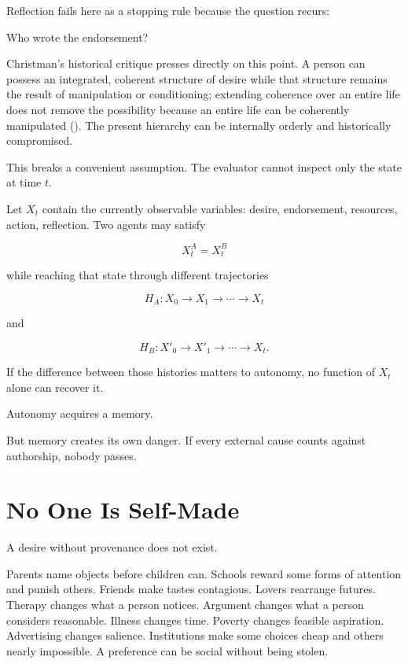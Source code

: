 \documentclass[
  10.5pt,
  letterpaper,
]{article}
\begin{document}
Reflection fails here as a stopping rule because the question recurs:

Who wrote the endorsement?

Christman's historical critique presses directly on this point. A person
can possess an integrated, coherent structure of desire while that
structure remains the result of manipulation or conditioning; extending
coherence over an entire life does not remove the possibility because an
entire life can be coherently manipulated
(). The present
hierarchy can be internally orderly and historically compromised.

This breaks a convenient assumption. The evaluator cannot inspect only
the state at time \(t\).

Let \(X_t\) contain the currently observable variables: desire,
endorsement, resources, action, reflection. Two agents may satisfy

\[
X_t^A = X_t^B
\]

while reaching that state through different trajectories

\[
H_A: X_0 \rightarrow X_1 \rightarrow \cdots \rightarrow X_t
\]

and

\[
H_B: X'_0 \rightarrow X'_1 \rightarrow \cdots \rightarrow X_t.
\]

If the difference between those histories matters to autonomy, no
function of \(X_t\) alone can recover it.

Autonomy acquires a memory.

But memory creates its own danger. If every external cause counts
against authorship, nobody passes.

\section{No One Is Self-Made}\label{no-one-is-self-made}

A desire without provenance does not exist.

Parents name objects before children can. Schools reward some forms of
attention and punish others. Friends make tastes contagious. Lovers
rearrange futures. Therapy changes what a person notices. Argument
changes what a person considers reasonable. Illness changes time.
Poverty changes feasible aspiration. Advertising changes salience.
Institutions make some choices cheap and others nearly impossible. A
preference can be social without being stolen.
\end{document}
